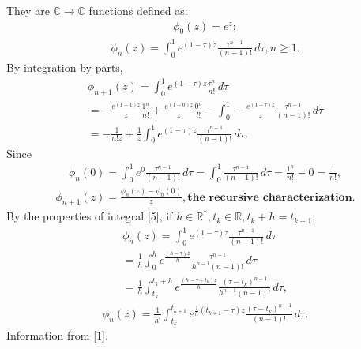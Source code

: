 \documentclass[letterpaper,10pt,english]{jupyterBook}
\begin{document}
\sphinxAtStartPar
They are \(\mathbb{C} \rightarrow \mathbb{C}\) functions defined as:
\begin{equation*}
\begin{split}
  \phi_0 (z) = e^z;
\end{split}
\end{equation*}\begin{equation*}
\begin{split}
  \phi_n (z) = \int_{0}^{1} e^{(1-\tau)z} \frac{\tau^{n-1}}{(n-1)!} \,d\tau, n \geq 1.
\end{split}
\end{equation*}
\sphinxAtStartPar
By integration by parts,
\begin{equation*}
\begin{split}
  \phi_{n+1} (z) = \int_{0}^{1} e^{(1-\tau)z} \frac{\tau^n}{n!} \,d\tau \\
  = - \frac{e^{(1-1)z}}{z} \frac{1^n}{n!} + \frac{e^{(1-0)z}}{z} \frac{0^n}{l!} - \int_{0}^{1} -\frac{e^{(1-\tau)z}}{z} \frac{\tau^{n-1}}{(n-1)!} \,d\tau \\
  = - \frac{1}{n!z} + \frac{1}{z}\int_{0}^{1} e^{(1-\tau)z} \frac{\tau^{n-1}}{(n-1)!} \,d\tau.
\end{split}
\end{equation*}
\sphinxAtStartPar
Since
\begin{equation*}
\begin{split}
  \phi_n(0) = \int_{0}^{1} e^0 \frac{\tau^{n-1}}{(n-1)!} \,d\tau = \int_{0}^{1} \frac{\tau^{n-1}}{(n-1)!} \,d\tau = \frac{1^n}{n!} - 0 = \frac{1}{n!},
\end{split}
\end{equation*}\begin{equation*}
\begin{split}
  \phi_{n+1}(z) = \frac{\phi_n(z) - \phi_n(0)}{z}, \textbf{the recursive characterization}.
\end{split}
\end{equation*}
\sphinxAtStartPar
By the properties of integral {[}5{]}, if \(h \in \mathbb{R}^*, t_k \in \mathbb{R}, t_k+h = t_{k+1},\)
\begin{equation*}
\begin{split}
  \phi_n (z) = \int_{0}^{1} e^{(1-\tau)z} \frac{\tau^{n-1}}{(n-1)!} \,d\tau \\
  = \frac{1}{h}\int_{0}^{h} e^{\frac{(h-\tau)z}{h}} \frac{\tau^{n-1}}{h^{n-1}(n-1)!} \,d\tau \\
  = \frac{1}{h}\int_{t_k}^{t_k + h} e^{\frac{(h-\tau+t_k)z}{h}} \frac{(\tau - t_k)^{n-1}}{h^{n-1}(n-1)!} \,d\tau,
\end{split}
\end{equation*}\begin{equation*}
\begin{split}
  \phi_n (z) = \frac{1}{h^l}\int_{t_k}^{t_{k+1}} e^{\frac{1}{h}(t_{k+1}-\tau)z} \frac{(\tau - t_k)^{n-1}}{(n-1)!} \,d\tau.
\end{split}
\end{equation*}
\sphinxAtStartPar
Information from {[}1{]}.
\end{document}
